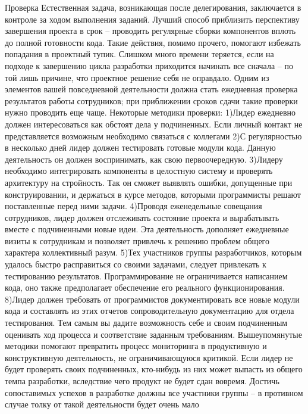 \documentclass{../industrial-development}
\begin{document}
\lecturenotes Проверка 
Естественная задача, возникающая после делегирования, заключается в контроле за ходом выполнения заданий. Лучший способ приблизить перспективу завершения проекта в срок – проводить регулярные сборки компонентов вплоть до полной готовности кода. Такие действия, помимо прочего, помогают избежать попадания в проектный тупик. Слишком много времени теряется, если на подходе к завершению цикла разработки приходится начинать все сначала – по той лишь причине, что проектное решение себя не оправдало. Одним из элементов вашей повседневной деятельности должна стать ежедневная проверка результатов работы сотрудников; при приближении сроков сдачи такие проверки нужно проводить еще чаще. 
Некоторые методики проверки: 
1)Лидер ежедневно должен интересоваться как обстоят дела у подчиненных. Если личный контакт не представляется возможным необходимо связаться с коллегами 
2)С регулярностью в несколько дней лидер должен тестировать готовые модули кода. Данную деятельность он должен воспринимать, как свою первоочередную. 
3)Лидеру необходимо интегрировать компоненты в целостную систему и проверять архитектуру на стройность. Так он сможет выявлять ошибки, допущенные при конструировании, и держаться в курсе методов, которыми программисты решают поставленные перед ними задачи. 
4)Проводя еженедельные совещания сотрудников, лидер должен отслеживать состояние проекта и вырабатывать вместе с подчиненными новые идеи. Эта деятельность дополняет ежедневные визиты к сотрудникам и позволяет привлечь к решению проблем общего характера коллективный разум. 
5)Тех участников группы разработчиков, которым удалось быстро расправиться со своими задачами, следует привлекать к тестированию результатов. Программирование не ограничивается написанием кода, оно также предполагает обеспечение его реального функционирования. 
8)Лидер должен требовать от программистов документировать все новые модули кода и составлять из этих отчетов сопроводительную документацию для отдела тестирования. Тем самым вы дадите возможность себе и своим подчиненным оценивать ход процесса и соответствие заданным требованиям. 
Вышеупомянутые методики помогают превратить процесс мониторинга в продуктивную и конструктивную деятельность, не ограничивающуюся критикой. Если лидер не будет проверять своих подчиненных, кто-нибудь из них может выпасть из общего темпа разработки, вследствие чего продукт не будет сдан вовремя. Достичь сопоставимых успехов в разработке должны все участники группы – в противном случае толку от такой деятельности будет очень мало
\end{document}
